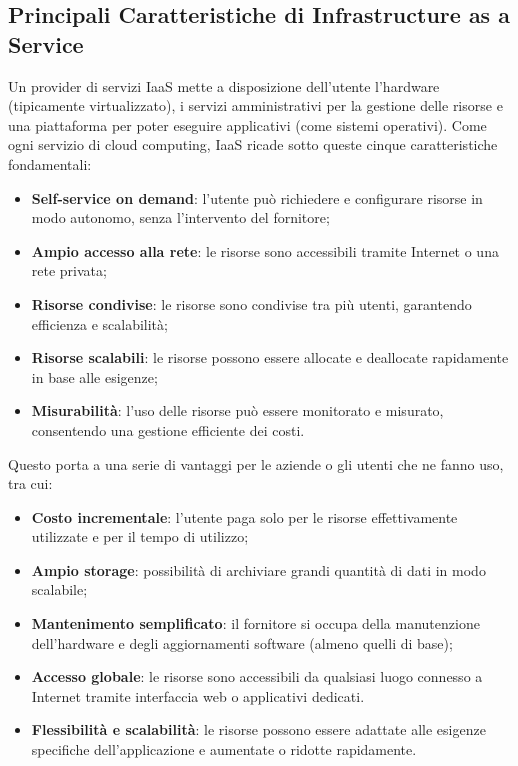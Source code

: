 \documentclass[12pt,a4paper,openright,twoside]{book}
\begin{document}
\subsection{Principali Caratteristiche di Infrastructure as a Service}
Un provider di servizi \ac{IaaS} mette a disposizione dell'utente l'hardware (tipicamente virtualizzato), i servizi amministrativi per la gestione delle risorse e una piattaforma per poter eseguire applicativi (come sistemi operativi).
Come ogni servizio di cloud computing, \ac{IaaS} ricade sotto queste cinque caratteristiche fondamentali\cite{bhardwaj2010cloud}:
\begin{itemize}
    \item \textbf{Self-service on demand}: l'utente può richiedere e configurare risorse in modo autonomo, senza l'intervento del fornitore;
    \item \textbf{Ampio accesso alla rete}: le risorse sono accessibili tramite Internet o una rete privata;
    \item \textbf{Risorse condivise}: le risorse sono condivise tra più utenti, garantendo efficienza e scalabilità;
    \item \textbf{Risorse scalabili}: le risorse possono essere allocate e deallocate rapidamente in base alle esigenze;
    \item \textbf{Misurabilità}: l'uso delle risorse può essere monitorato e misurato, consentendo una gestione efficiente dei costi.
\end{itemize}
Questo porta a una serie di vantaggi per le aziende o gli utenti che ne fanno uso, tra cui\cite{bhardwaj2010cloud}:
\begin{itemize}
    \item \textbf{Costo incrementale}: l'utente paga solo per le risorse effettivamente utilizzate e per il tempo di utilizzo;
    \item \textbf{Ampio storage}: possibilità di archiviare grandi quantità di dati in modo scalabile;
    \item \textbf{Mantenimento semplificato}: il fornitore si occupa della manutenzione dell'hardware e degli aggiornamenti software (almeno quelli di base);
    \item \textbf{Accesso globale}: le risorse sono accessibili da qualsiasi luogo connesso a Internet tramite interfaccia web o applicativi dedicati.
    \item \textbf{Flessibilità e scalabilità}: le risorse possono essere adattate alle esigenze specifiche dell'applicazione e aumentate o ridotte rapidamente.
\end{itemize}
\end{document}
